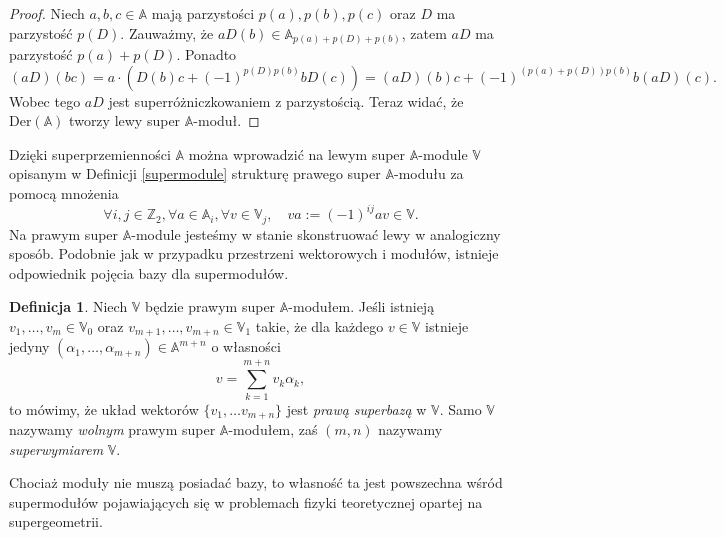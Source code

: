 \documentclass[11pt,a4paper]{report}
\theoremstyle{definition}
\newtheorem{definition}[theorem]{Definicja}
\begin{document}
\begin{proof}
	Niech $a,b,c \in \mathbb{A}$ mają parzystości $p(a), p(b), p(c)$ oraz $D$ ma parzystość $p(D)$. Zauważmy, że $aD(b) \in \mathbb{A}_{p(a) + p(D) + p(b)}$, zatem $aD$ ma parzystość $p(a)+p(D)$. Ponadto 
	\begin{equation}
		\label{eq:superdifferentiation_module_structure}
		(aD)(bc) = a \cdot (D(b) c + (-1)^{p(D)p(b)}bD(c)) = (aD)(b)c + (-1)^{(p(a)+p(D))p(b)}b(aD)(c).
	\end{equation}
	Wobec tego $aD$ jest superróżniczkowaniem z parzystością. Teraz widać, że $\mathrm{Der}(\mathbb{A})$ tworzy lewy super $\mathbb{A}$-moduł.
\end{proof}

Dzięki superprzemienności $\mathbb{A}$ można wprowadzić na lewym super $\mathbb{A}$-module $\mathbb{V}$ opisanym w Definicji \ref{supermodule} strukturę prawego super $\mathbb{A}$-modułu za pomocą mnożenia 
\begin{equation}
	\label{disupermodule}
	\forall i,j \in \mathbb{Z}_2, \forall a \in \mathbb{A}_i, \forall v \in \mathbb{V}_j, \quad va := (-1)^{ij}av \in \mathbb{V}.
\end{equation}
Na prawym super $\mathbb{A}$-module jesteśmy w stanie skonstruować lewy w analogiczny sposób. Podobnie jak w przypadku przestrzeni wektorowych i modułów, istnieje odpowiednik pojęcia bazy dla supermodułów.

\begin{definition}
	\label{superbasis}
	Niech $\mathbb{V}$ będzie prawym super $\mathbb{A}$-modułem. Jeśli istnieją $v_1, \ldots, v_m \in \mathbb{V}_0$ oraz $v_{m+1}, \ldots ,v_{m+n} \in \mathbb{V}_1$ takie, że dla każdego $v\in \mathbb{V}$ istnieje jedyny $(\alpha_1, \ldots, \alpha_{m+n}) \in \mathbb{A}^{m+n}$ o własności
	\begin{equation*}
		v = \sum_{k=1}^{m+n} v_k \alpha_k,
	\end{equation*}
	to mówimy, że układ wektorów $\{ v_1, \ldots v_{m+n} \}$ jest \textit{prawą superbazą} w $\mathbb{V}$. Samo $\mathbb{V}$ nazywamy \textit{wolnym} prawym super $\mathbb{A}$-modułem, zaś $(m,n)$ nazywamy \textit{superwymiarem} $\mathbb{V}$.
\end{definition}

Chociaż moduły nie muszą posiadać bazy, to własność ta jest powszechna wśród supermodułów pojawiających się w problemach fizyki teoretycznej opartej na supergeometrii. 
\end{document}
